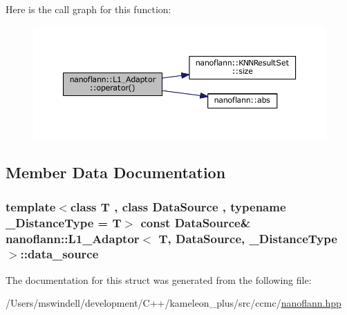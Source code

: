 Here is the call graph for this function\-:
\nopagebreak
\begin{figure}[H]
\begin{center}
\leavevmode
\includegraphics[width=350pt]{structnanoflann_1_1_l1___adaptor_a84e509cc50ad2bb6bc3fbe9f073ea4e3_cgraph}
\end{center}
\end{figure}




\subsection{Member Data Documentation}
\hypertarget{structnanoflann_1_1_l1___adaptor_af5ffa8683071c1452a4619cce0a6f707}{
\subsubsection[{data\-\_\-source}]{\setlength{\rightskip}{0pt plus 5cm}template$<$class T , class Data\-Source , typename \-\_\-\-Distance\-Type  = T$>$ const Data\-Source\& {\bf nanoflann\-::\-L1\-\_\-\-Adaptor}$<$ T, Data\-Source, \-\_\-\-Distance\-Type $>$\-::data\-\_\-source}}\label{structnanoflann_1_1_l1___adaptor_af5ffa8683071c1452a4619cce0a6f707}


The documentation for this struct was generated from the following file\-:\begin{DoxyCompactItemize}
\item 
/\-Users/mswindell/development/\-C++/kameleon\-\_\-plus/src/ccmc/\hyperlink{nanoflann_8hpp}{nanoflann.\-hpp}\end{DoxyCompactItemize}

